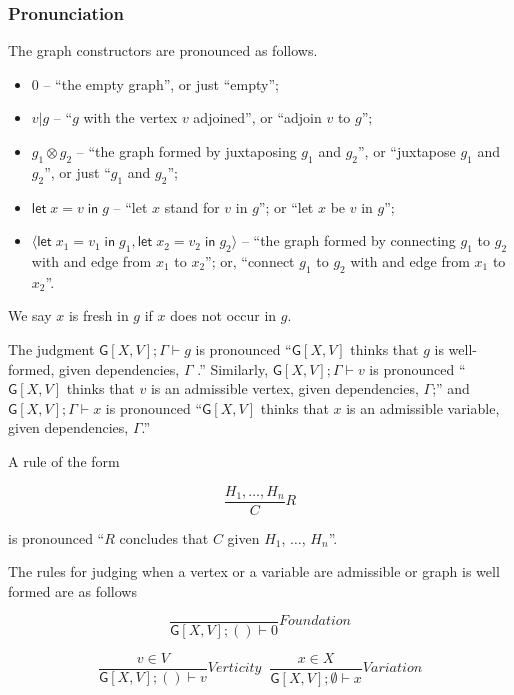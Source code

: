 \hypertarget{pronunciation}{%
\subsubsection{Pronunciation}\label{pronunciation}}

The graph constructors are pronounced as follows.

\begin{itemize}
\item
  \(0\) -- ``the empty graph'', or just ``empty'';
\item
  \(v | g\) -- ``\(g\) with the vertex \(v\) adjoined'', or ``adjoin
  \(v\) to \(g\)'';
\item
  \(g_1 \otimes g_2\) -- ``the graph formed by juxtaposing \(g_1\) and
  \(g_2\)'', or ``juxtapose \(g_1\) and \(g_2\)'', or just ``\(g_1\) and
  \(g_2\)'';
\item
  \(\mathsf{let}\; x = v \; \mathsf{in}\; g\) -- ``let \(x\) stand for
  \(v\) in \(g\)''; or ``let \(x\) be \(v\) in \(g\)'';
\item
  \(\langle \mathsf{let}\; x_1 = v_1 \; \mathsf{in}\; g_1,\mathsf{let}\; x_2 = v_2 \; \mathsf{in}\; g_2\rangle\)
  -- ``the graph formed by connecting \(g_1\) to \(g_2\) with and edge
  from \(x_1\) to \(x_2\)''; or, ``connect \(g_1\) to \(g_2\) with and
  edge from \(x_1\) to \(x_2\)''.
\end{itemize}

We say $x$ is fresh in $g$ if $x$ does not occur in $g$.

The judgment \(\mathsf{G}[X,V]; \Gamma \vdash g\) is pronounced
``\(\mathsf{G}[X,V]\) thinks that \(g\) is well-formed, given
dependencies, \(\Gamma\) .'' Similarly,
\(\mathsf{G}[X,V]; \Gamma \vdash v\) is pronounced ``\(\mathsf{G}[X,V]\)
thinks that \(v\) is an admissible vertex, given dependencies,
\(\Gamma\);'' and \(\mathsf{G}[X,V]; \Gamma \vdash x\) is pronounced
``\(\mathsf{G}[X,V]\) thinks that \(x\) is an admissible variable, given
dependencies, \(\Gamma\).''

A rule of the form

\[\frac{ H_1, \ldots , H_n }{ C }R\]

is pronounced ``\(R\) concludes that \(C\) given \(H_1\), \(\ldots\),
\(H_n\)''.

The rules for judging when a vertex or a variable are admissible or
graph is well formed are as follows

\[\frac{ }{ \mathsf{G}[X,V]; () \vdash 0}Foundation\]

\[\frac{ v \in V }{ \mathsf{G}[X,V]; () \vdash v}Verticity \;\;\frac{ x \in X }{ \mathsf{G}[X,V]; \emptyset \vdash x}Variation\]


